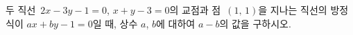 두 직선~$2x-3y-1=0$, $x+y-3=0$의 교점과 점~$(1,\,1)$을 지나는 직선의 방정식이 $ax+by-1=0$일 때, 상수 $a$, $b$에 대하여 $a-b$의 값을 구하시오.
